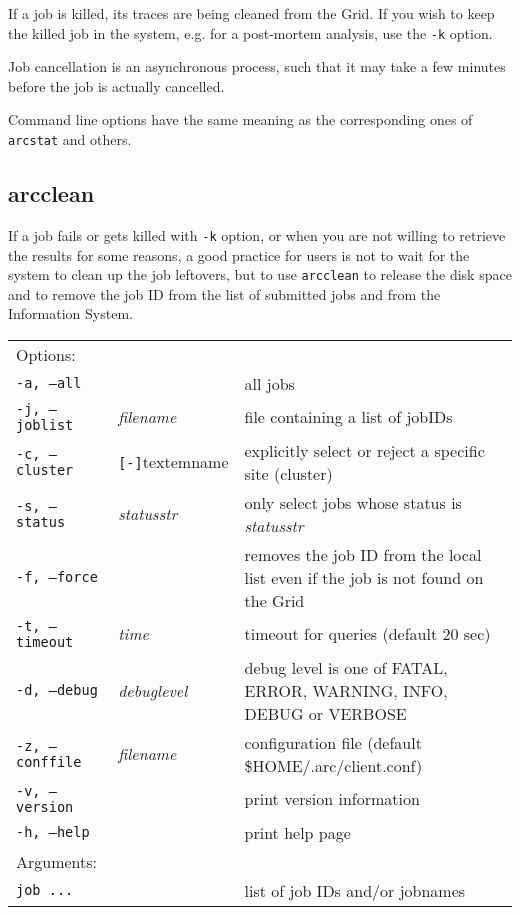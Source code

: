 If a job is killed, its traces are being cleaned from the Grid. If you wish to keep the killed job
in the system, e.g. for a post-mortem analysis, use the \verb#-k# option.

\begin{framed}
   Job cancellation is an asynchronous process, such that it
   may take a few minutes before the job is actually cancelled.
\end{framed}

Command line options have the same meaning as the corresponding ones of \verb#arcstat# and others.


\subsection{arcclean}
\label{sec:arcclean}

If a job fails or gets killed with \verb#-k# option, or when you are not willing 
to retrieve the results for some reasons, a good practice for users is not to wait 
for the system to clean up the job leftovers, but to use 
\texttt{arcclean} to release the disk 
space and to remove the job ID from the list of submitted jobs and from the Information System. 

\hspace*{0.5cm}
\begin{shaded}
\end{shaded}
\begin{longtable}{llp{8cm}}
   Options:&&\\
   \texttt{-a, --all}& & all jobs\\
   \texttt{-j, --joblist}& \textit{filename} & file containing a list of jobIDs\\
   \texttt{-c, --cluster}&\verb#[-]#textem{name}&explicitly select or reject a specific site (cluster)\\
   \texttt{-s, --status}& \textit{statusstr} &only select jobs whose status is \textit{statusstr}\\
   \texttt{-f, --force} & & removes the job ID from the local list even if the job is not found on the Grid\\
   \texttt{-t, --timeout}& \textit{time} & timeout for queries (default 20 sec)\\
   \texttt{-d, --debug}& \textit{debuglevel}&debug level is one of  FATAL, ERROR, WARNING, INFO, DEBUG or VERBOSE\\
   \texttt{-z, --conffile}&\textit{filename}& configuration file (default {\$}HOME/.arc/client.conf)\\
   \texttt{-v, --version}& & print version information\\
   \texttt{-h, --help}& & print help page\\
   Arguments:&&\\
   \texttt{job ...} && list of job IDs and/or jobnames\\
\end{longtable}

